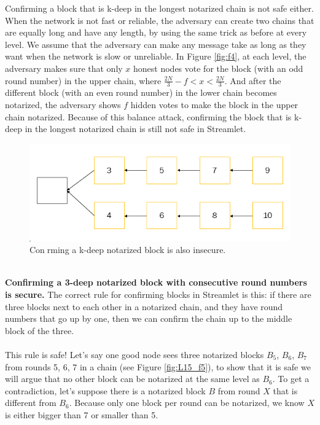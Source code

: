 Confirming a block that is k-deep in the longest notarized chain is not safe either. When the network is not fast or reliable, the adversary can create two chains that are equally long and have any length, by using the same trick as before at every level. We assume that the adversary can make any message take as long as they want when the network is slow or unreliable. In Figure \ref{fig:f4}, at each level, the adversary makes sure that only $x$ honest nodes vote for the block (with an odd round number) in the upper chain, where  $\frac{2N}{3}-f < x < \frac{2N}{3}$. And after the different block (with an even round number) in the lower chain becomes notarized, the adversary shows $f$ hidden votes to make the block in the upper chain notarized. Because of this balance attack, confirming the block that is k-deep in the longest notarized chain is still not safe in Streamlet.
\begin{figure}[h!]
	\centering
	\includegraphics[width=0.5\linewidth]{Fig/15/F4}
	\caption{Conrming a k-deep notarized block is also insecure.}
	\label{fig:L15_f4}
\end{figure}\\
\textbf{Confirming a 3-deep notarized block with consecutive round numbers is secure.} The correct rule for confirming blocks in Streamlet is this: if there are three blocks next to each other in a notarized chain, and they have round numbers that go up by one, then we can confirm the chain up to the middle block of the three.\\\\
This rule is safe! Let’s say one good node sees three notarized blocks $B_5$, $B_6$, $B_7$ from rounds 5, 6, 7 in a chain (see Figure \ref{fig:L15_f5}), to show that it is safe we will argue that no other block can be notarized at the same level as $B_6$. To get a contradiction, let’s suppose there is a notarized block $B$ from round $X$ that is different from $B_6$. Because only one block per round can be notarized, we know $X$ is either bigger than 7 or smaller than 5.
